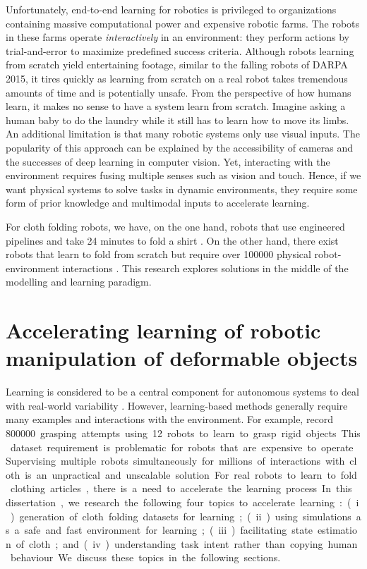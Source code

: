 \documentclass[\home/main.tex]{subfiles}
\begin{document}
Unfortunately, end-to-end learning for robotics is privileged to organizations containing massive computational power and expensive robotic farms. The robots in these farms operate \emph{interactively} in an environment: they perform actions by trial-and-error to maximize predefined success criteria. Although robots learning from scratch yield entertaining footage, similar to the falling robots of DARPA 2015, it tires quickly as learning from scratch on a real robot takes tremendous amounts of time and is potentially unsafe. From the perspective of how humans learn, it makes no sense to have a system learn from scratch. Imagine asking a human baby to do the laundry while it still has to learn how to move its limbs.
An additional limitation is that many robotic systems only use visual inputs. The popularity of this approach can be explained by the accessibility of cameras and the successes of deep learning in computer vision. Yet, interacting with the environment requires fusing multiple senses such as vision and touch. 
Hence, if we want physical systems to solve tasks in dynamic environments, they require some form of prior knowledge and multimodal inputs to accelerate learning.

For cloth folding robots, we have, on the one hand, robots that use engineered pipelines and take 24 minutes to fold a shirt \autocite{Maitin2010}. On the other hand, there exist robots that learn to fold from scratch but require over \qty{100000}{} physical robot-environment interactions \autocite{Matas2018}. This research explores solutions in the middle of the modelling and learning paradigm.



\section{Accelerating learning of robotic manipulation of deformable objects} \label{sec:intro_acc_learning}
Learning is considered to be a central component for autonomous systems to deal with real-world variability \autocite{kroemer2021review}. However, learning-based methods generally require many examples and interactions with the environment. For example, \textcite{Levine2018} record \qty{800000} grasping attempts using \qty{12} robots to learn to grasp rigid objects. This dataset requirement is problematic for robots that are expensive to operate. Supervising multiple robots simultaneously for millions of interactions with cloth is an unpractical and unscalable solution. For real robots to learn to fold clothing articles, there is a need to accelerate the learning process. In this dissertation, we research the following four topics to accelerate learning:
(i) generation of cloth folding datasets for learning;
(ii) using simulations as a safe and fast environment for learning;
(iii) facilitating state estimation of cloth; and
(iv) understanding task intent rather than copying human behaviour.
We discuss these topics in the following sections.
\end{document}
